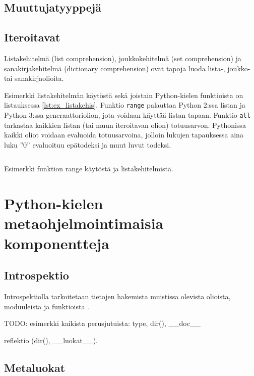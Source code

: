 \documentclass[finnish]{tktltiki2}
\theoremstyle{definition}
\theoremstyle{remark}
\begin{document}

\subsection{Muuttujatyyppejä}

\subsection{Iteroitavat}

Listakehitelmä (list comprehension), joukkokehitelmä (set comprehension) ja sanakirjakehitelmä (dictionary comprehension) ovat tapoja luoda lista-, joukko- tai sanakirjaolioita. 

Esimerkki listakehitelmän käytöstä sekä joistain Python-kielen funktioista on listauksessa \ref{lst:ex_listakehis}. Funktio \verb|range| palauttaa Python 2:ssa listan ja Python 3:ssa generaattoriolion, jota voidaan käyttää listan tapaan. Funktio \verb|all| tarkastaa kaikkien listan (tai muun iteroitavan olion) totuusarvon. Pythonissa kaikki oliot voidaan evaluoida totuusarvoina, jolloin lukujen tapauksessa aina luku ''0'' evaluoituu epätodeksi ja muut luvut todeksi.

\begin{listing}
    \inputminted{python}{code/luvut.py}
    \label{lst:ex_listakehis}
    \caption{Esimerkki funktion range käytöstä ja listakehitelmistä.}
\end{listing}


\section{Python-kielen metaohjelmointimaisia komponentteja}

\subsection{Introspektio}

Introspektiolla tarkoitetaan tietojen hakemista muistissa olevista olioista, moduuleista ja funktioista \cite{dive-into-python}.

TODO: esimerkki kaikista perusjutuista: type, dir(), \_\_doc\_\_

reflektio (dir(), \_\_luokat\_\_). 

\cite{dive-into-python}

\subsection{Metaluokat}
\end{document}
